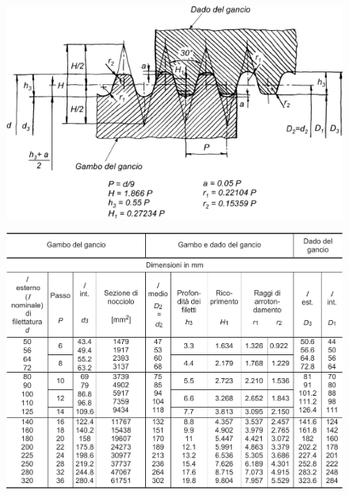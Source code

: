 \begin{figure}[H]
\centering
\begin{minipage}{.45\textwidth}
  \centering
  \includegraphics[width=.9\linewidth]{imgs/Cap5/5 FilDim}
  \label{fig:FilDim}
\end{minipage}%
\begin{minipage}{.45\textwidth}
  \centering
  \includegraphics[width=.9\linewidth]{imgs/FilettaturaTabella}
  \label{fig:FilettaturaTabella}
\end{minipage}
\end{figure}

